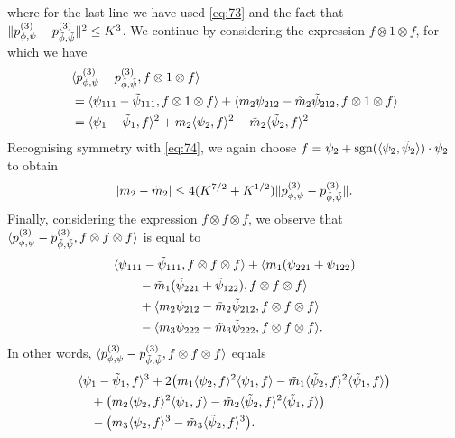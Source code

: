 \documentclass[journal]{IEEEtran}
\newcommand{\sgn}{\mathrm{sgn}}
\newcommand{\1}{\boldsymbol{1}}
\DeclarePairedDelimiter{\Inner}{\langle}{\rangle}
\DeclarePairedDelimiter{\brackets}{(}{)}
\DeclarePairedDelimiter{\norm}{\lVert}{\rVert}
\DeclarePairedDelimiter{\abs}{\lvert}{\rvert}
\begin{document}
where for the last line we have used \cref{eq:73} and the fact that $\norm{p_{\phi,\psi}^{(3)} - p_{\tilde{\phi},\tilde{\psi}}^{(3)}}^2 \leq K^3$. We
continue by considering the expression $f \otimes 1 \otimes f$, for which we have
\begin{align*}
	&\Inner{p_{\phi,\psi}^{(3)} - p_{\tilde{\phi},\tilde{\psi}}^{(3)},f \otimes 1 \otimes f}\\%
	&= \Inner{\psi_{111} - \tilde{\psi}_{111}, f \otimes 1 \otimes f}%
	+ \Inner{m_2 \psi_{212} - \tilde{m}_2\tilde{\psi}_{212}, f \otimes 1 \otimes f}\\
	&= \Inner{\psi_1 - \tilde{\psi}_1,f}^2 + m_2\Inner{\psi_2,f}^2 - \tilde{m}_2 \Inner{\tilde{\psi}_2,f}^2
\end{align*}
Recognising symmetry with \cref{eq:74}, we again choose $f = \psi_2 + \sgn(\Inner{\psi_2,\tilde{\psi}_2})\cdot\tilde{\psi}_2$ to obtain
\begin{equation}
	\label{eq:78}
	\abs{m_2 - \tilde{m}_2}%
	\leq 4(K^{7/2}+K^{1/2}) \norm{p_{\phi,\psi}^{(3)} - p_{\tilde{\phi},\tilde{\psi}}^{(3)}}.
\end{equation}
Finally, considering the expression $f \otimes f \otimes f$, we observe that $\Inner{p_{\phi,\psi}^{(3)} - p_{\tilde{\phi},\tilde{\psi}}^{(3)},f \otimes f \otimes f}$ is equal to
\begin{equation*}
	\begin{split}
&\Inner{\psi_{111} - \tilde{\psi}_{111}, f \otimes f \otimes f}%
                  + \Inner{m_1(\psi_{221}+\psi_{122})\\
          &\qquad- \tilde{m}_1(\tilde{\psi}_{221}+\tilde{\psi}_{122}),f\otimes f \otimes f}\\%
		&\qquad+ \Inner{m_2 \psi_{212} - \tilde{m}_2\tilde{\psi}_{212}, f \otimes f \otimes f}\\
          &\qquad- \Inner{m_3 \psi_{222} - \tilde{m}_3 \tilde{\psi}_{222},f \otimes f \otimes f}.
	\end{split}
\end{equation*}
In other words, $\Inner{p_{\phi,\psi}^{(3)} - p_{\tilde{\phi},\tilde{\psi}}^{(3)},f \otimes f \otimes f}$ equals
\begin{equation*}
  \begin{split}
    &\Inner{\psi_1 - \tilde{\psi}_1,f}^3%
		+ 2\brackets[\big]{m_1\Inner{\psi_2,f}^2\Inner{\psi_1,f} - \tilde{m}_1\Inner{\tilde{\psi}_2,f}^2\Inner{\tilde{\psi}_1,f}  }\\
		&\quad+ \brackets[\big]{m_2\Inner{\psi_2,f}^2\Inner{\psi_1,f} - \tilde{m}_2\Inner{\tilde{\psi}_2,f}^2\Inner{\tilde{\psi}_1,f}  }\\
          &\quad- \brackets[\big]{ m_3 \Inner{\psi_2,f}^3 - \tilde{m}_3 \Inner{\tilde{\psi}_2,f}^3  }.
	\end{split}
\end{equation*}
\end{document}
